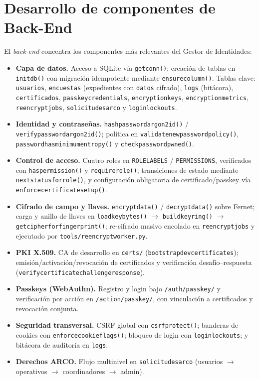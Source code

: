 \documentclass[10pt,letterpaper]{report}
\renewcommand{\_}{\textunderscore\allowbreak}
\begin{document}
\section{Desarrollo de componentes de Back-End}
El \textit{back-end} concentra los componentes m\'as relevantes del Gestor de
Identidades:

\begin{itemize}[leftmargin=1.4em]
  \item \textbf{Capa de datos.} Acceso a SQLite v\'ia \texttt{get\_conn()};
  creaci\'on de tablas en \texttt{init\_db()} con migraci\'on idempotente mediante
  \texttt{ensure\_column()}. Tablas clave: \texttt{usuarios},
  \texttt{encuestas} (expedientes con \texttt{datos} cifrado), \texttt{logs}
  (bit\'acora), \texttt{certificados}, \texttt{passkey\_credentials},
  \texttt{encryption\_keys}, \texttt{encryption\_metrics}, \texttt{reencrypt\_jobs},
  \texttt{solicitudes\_arco} y \texttt{login\_lockouts}.
  \item \textbf{Identidad y contrase\~nas.} \texttt{hash\_password\_argon2id()} /
  \texttt{verify\_password\_argon2id()}; pol\'itica en
  \texttt{validate\_new\_password\_policy()},
  \texttt{password\_has\_minimum\_entropy()} y \texttt{check\_password\_pwned()}.
  \item \textbf{Control de acceso.} Cuatro roles en \texttt{ROLE\_LABELS} /
  \texttt{PERMISSIONS}, verificados con \texttt{has\_permission()} y
  \texttt{require\_role()}; transiciones de estado mediante
  \texttt{next\_status\_for\_role()}, y configuraci\'on obligatoria de
  certificado/passkey v\'ia \texttt{enforce\_certificate\_setup()}.
  \item \textbf{Cifrado de campo y llaves.} \texttt{encrypt\_data()} /
  \texttt{decrypt\_data()} sobre Fernet; carga y anillo de llaves en
  \texttt{\_load\_key\_bytes()} $\rightarrow$ \texttt{\_build\_keyring()}
  $\rightarrow$ \texttt{get\_cipher\_for\_fingerprint()}; re-cifrado masivo
  encolado en \texttt{reencrypt\_jobs} y ejecutado por
  \texttt{tools/reencrypt\_worker.py}.
  \item \textbf{PKI X.509.} CA de desarrollo en \texttt{certs/}
  (\texttt{bootstrap\_dev\_certificates}); emisi\'on/activaci\'on/revocaci\'on de
  certificados y verificaci\'on desaf\'io--respuesta
  (\texttt{verify\_certificate\_challenge\_response}).
  \item \textbf{Passkeys (WebAuthn).} Registro y login bajo
  \texttt{\slash auth\slash passkey\slash *} y verificaci\'on por acci\'on en
  \texttt{\slash action\slash passkey\slash *}, con vinculaci\'on a certificados y revocaci\'on
  conjunta.
  \item \textbf{Seguridad transversal.} CSRF global con \texttt{csrf\_protect()};
  banderas de cookies con \texttt{enforce\_cookie\_flags()}; bloqueo de login con
  \texttt{login\_lockouts}; y bit\'acora de auditor\'ia en \texttt{logs}.
  \item \textbf{Derechos ARCO.} Flujo multinivel en \texttt{solicitudes\_arco}
  (usuarios $\rightarrow$ operativos $\rightarrow$ coordinadores $\rightarrow$
  admin).
\end{itemize}
\end{document}
